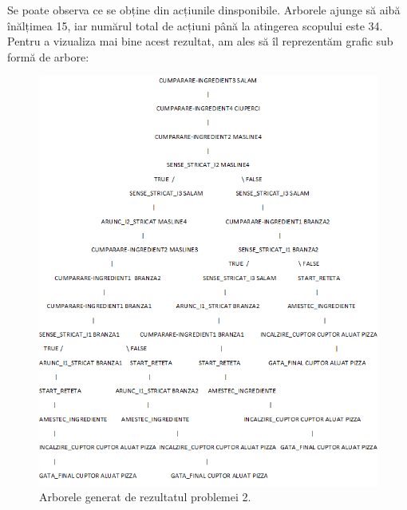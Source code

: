    \newline 
    \newline
    Se poate observa ce se obține din acțiunile dinsponibile. Arborele ajunge să aibă înălțimea 15, iar numărul total de acțiuni până la atingerea scopului este 34. Pentru a vizualiza mai bine acest rezultat, am ales să îl reprezentăm grafic sub formă de arbore:
     \newline 
    \newline
    \begin{figure}[htb]
  \includegraphics[width=\linewidth]{diagrama.png}
 \caption{Arborele generat de rezultatul problemei 2.}
  \label{fig:boat1}
  \end{figure}